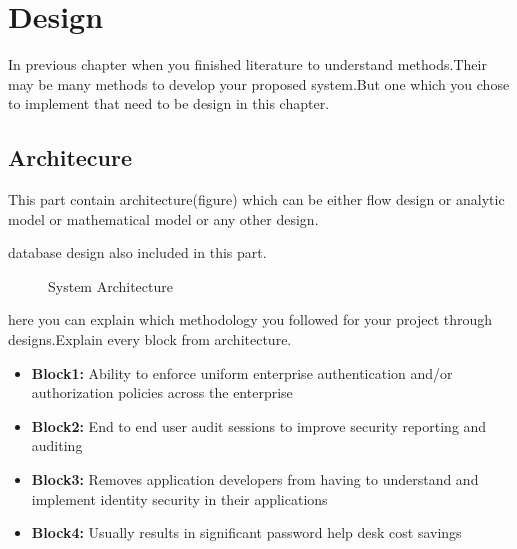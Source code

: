 \graphicspath{ {images/} }
\chapter{Design}
\hspace{5mm} In previous chapter when you finished literature to understand methods.Their may be many methods to develop your proposed system.But one which you chose to implement that need to be design in this chapter.


\section{Architecure}
\hspace{5mm}This part contain architecture(figure) which can be either flow design or analytic model or mathematical model or any other design.
\par database design also included in this part.
\\
\begin{figure}[h!]
\begin{center}
\end{center}
\caption {System Architecture}
\label{vmb2}
\vspace{0mm}
\end{figure}

\par here you can explain which methodology you followed for your project through designs.Explain every block from architecture.
\begin{itemize}
    \item \textbf{Block1:} Ability to enforce uniform enterprise authentication and/or authorization policies across the enterprise
    \item \textbf{Block2:} End to end user audit sessions to improve security reporting and auditing
    \item \textbf{Block3:} Removes application developers from having to understand and implement identity security in their applications
    \item \textbf{Block4:} Usually results in significant password help desk cost savings
\end{itemize}

